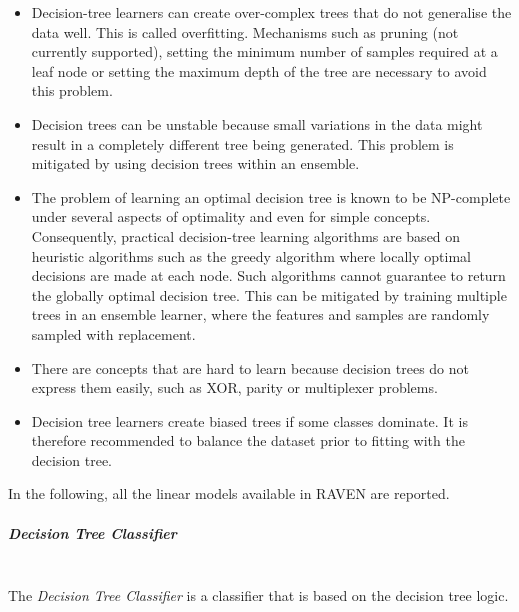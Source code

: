 \begin{itemize}
  \item Decision-tree learners can create over-complex trees that do not
  generalise the data well.
  This is called overfitting.
  Mechanisms such as pruning (not currently supported), setting the minimum
  number of samples required at a leaf node or setting the maximum depth of the
  tree are necessary to avoid this problem.
  \item Decision trees can be unstable because small variations in the data
  might result in a completely different tree being generated.
  This problem is mitigated by using decision trees within an ensemble.
  \item The problem of learning an optimal decision tree is known to be
  NP-complete under several aspects of optimality and even for simple concepts.
  Consequently, practical decision-tree learning algorithms are based on
  heuristic algorithms such as the greedy algorithm where locally optimal
  decisions are made at each node.
  Such algorithms cannot guarantee to return the globally optimal decision tree.
  This can be mitigated by training multiple trees in an ensemble learner, where
  the features and samples are randomly sampled with replacement.
  \item There are concepts that are hard to learn because decision trees do not
  express them easily, such as XOR, parity or multiplexer problems.
  \item Decision tree learners create biased trees if some classes dominate.
  It is therefore recommended to balance the dataset prior to fitting with the
  decision tree.
\end{itemize}
In the following, all the linear models available in RAVEN are reported.
%
\subparagraph{Decision Tree Classifier}
\mbox{}
\\The \textit{Decision Tree Classifier} is a classifier that is based on the
decision tree logic.
%
